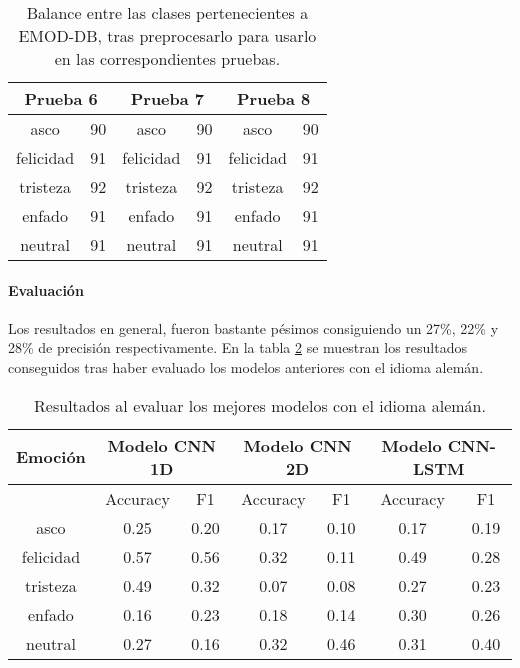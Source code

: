 \documentclass[11pt,a4paper,spanish]{book}
\begin{document}
	\begin{table}[H]
		\centering
		\begin{center}
			\begin{tabular}{ c  c | c  c |c  c }
				\multicolumn{2}{c|}{Prueba 6} &
				\multicolumn{2}{|c|}{Prueba 7} &
				\multicolumn{2}{|c}{Prueba 8} \\
				\hline
				asco 		& 90 & asco 	& 90 & asco 	  & 90\\
				felicidad 	& 91 & felicidad & 91 & felicidad & 91\\
				tristeza 	& 92 & tristeza & 92 & tristeza   & 92\\
				enfado 		& 91 & enfado 	& 91 & enfado 	  & 91\\
				neutral 	& 91 & neutral 	& 91 & neutral 	  & 91\\
				\hline
			\end{tabular}
			
			\caption{Balance entre las clases pertenecientes a EMOD-DB, tras preprocesarlo para usarlo en las correspondientes pruebas.}
			\label{ref:balanceTest678}
		\end{center}
	\end{table}
	
	\paragraph{Evaluación}
	Los resultados en general, fueron bastante pésimos consiguiendo un 27\%, 22\% y 28\% de precisión respectivamente.
	En la tabla \ref{results_TestGerman} se muestran los resultados conseguidos tras haber evaluado los modelos anteriores con el idioma alemán.
	\begin{table}[H]
		\centering
		\begin{center}
			\begin{tabular}{| c|| c c |  c c |  c c | }
				\hline
				\multicolumn{1}{|c||}{Emoción} & 
				\multicolumn{2}{|c|}{Modelo CNN 1D}&
				\multicolumn{2}{|c|}{Modelo CNN 2D} &
				\multicolumn{2}{|c|}{Modelo CNN-LSTM} \\
				
				\hline
				& 
				\multicolumn{1}{|c|}{Accuracy}&\multicolumn{1}{|c|}{F1}&
				\multicolumn{1}{|c|}{Accuracy}&\multicolumn{1}{|c|}{F1}&
				\multicolumn{1}{|c|}{Accuracy}&\multicolumn{1}{|c|}{F1}\\
				\hline
				
				asco 		& 0.25 & 0.20 & 0.17 & 0.10 & 0.17 & 0.19 \\
				felicidad 	& 0.57 & 0.56 & 0.32 & 0.11 & 0.49 & 0.28 \\
				tristeza 	& 0.49 & 0.32 & 0.07 & 0.08 & 0.27 & 0.23 \\
				enfado 		& 0.16 & 0.23 & 0.18 & 0.14 & 0.30 & 0.26\\
				neutral 	& 0.27 & 0.16 & 0.32 & 0.46 & 0.31 & 0.40\\
				\hline
			\end{tabular}
			
			\caption{Resultados al evaluar los mejores modelos con el idioma alemán.}
			\label{results_TestGerman}
		\end{center}
	\end{table}
\end{document}
